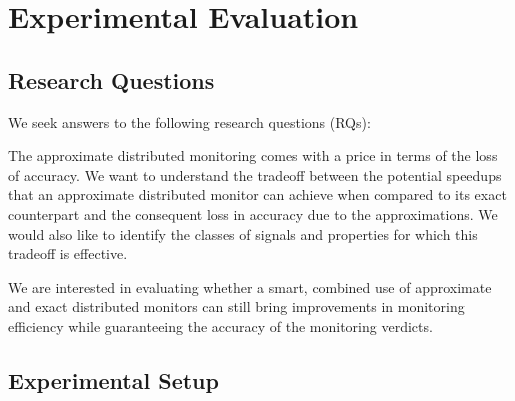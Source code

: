 \section{Experimental Evaluation} 
\label{sec:experiments}


\subsection{Research Questions}

We seek answers to the following research questions (RQs):
\vspace{-0.3em}
\begin{resq}
The approximate distributed monitoring comes with a price in terms of the loss of accuracy.
We want to understand the tradeoff between the potential speedups that an approximate distributed monitor can achieve when compared to its exact counterpart and the consequent loss in accuracy due to the approximations.
We would also like to identify the classes of signals and properties for which this tradeoff is effective. 
\end{resq}
\vspace{-0.8em}
\begin{resq}
We are interested in evaluating whether a smart, combined use of approximate and exact distributed monitors can still bring improvements in monitoring efficiency while guaranteeing the accuracy of the monitoring verdicts. 
\end{resq}


\subsection{Experimental Setup}

